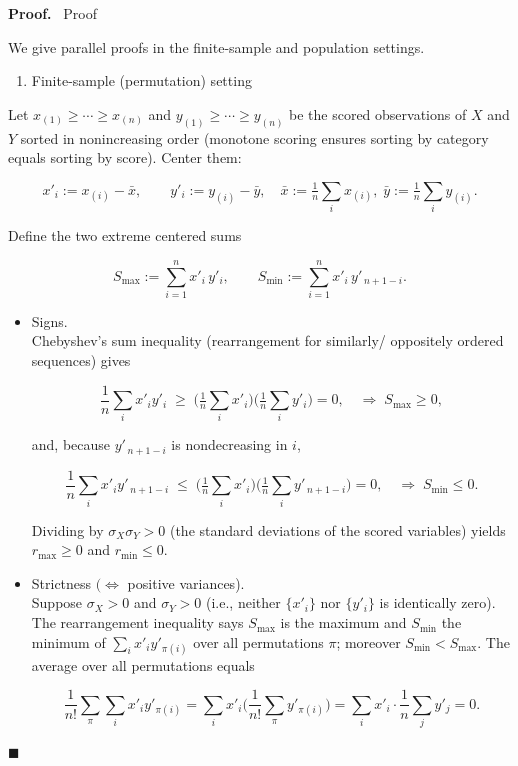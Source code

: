 \documentclass[
  12pt,
]{article}
\providecommand{\tightlist}{%
  \setlength{\itemsep}{0pt}\setlength{\parskip}{0pt}}
\theoremstyle{plain}
\theoremstyle{definition}
\renewenvironment{proof}
   {\par\noindent\textbf{Proof.}\ }
   {\hfill$\blacksquare$\par}
\theoremstyle{remark}
\begin{document}
\begin{proof}
Proof

We give parallel proofs in the finite-sample and population settings.

\begin{enumerate}
\def\labelenumi{\Alph{enumi})}
\tightlist
\item
  Finite-sample (permutation) setting
\end{enumerate}

Let \(x_{(1)}\ge\cdots\ge x_{(n)}\) and \(y_{(1)}\ge\cdots\ge y_{(n)}\)
be the scored observations of \(X\) and \(Y\) sorted in nonincreasing
order (monotone scoring ensures sorting by category equals sorting by
score). Center them:

\[x'_i := x_{(i)}-\bar x,\qquad y'_i := y_{(i)}-\bar y,\quad  
\bar x := \tfrac1n\sum_i x_{(i)},\;\bar y := \tfrac1n\sum_i y_{(i)}.\]

Define the two extreme centered sums

\[S_{\max} := \sum_{i=1}^n x'_i\,y'_i,\qquad  
S_{\min} := \sum_{i=1}^n x'_i\,y'_{\,n+1-i}.\]

\begin{itemize}
\item
  Signs.\\
  Chebyshev's sum inequality (rearrangement for similarly/ oppositely
  ordered sequences) gives

  \[\frac1n\sum_i x'_i y'_i \;\ge\; \Big(\tfrac1n\sum_i x'_i\Big)\Big(\tfrac1n\sum_i y'_i\Big)=0,  
    \quad\Rightarrow\; S_{\max}\ge 0,\]

  and, because \(y'_{\,n+1-i}\) is nondecreasing in \(i\),

  \[\frac1n\sum_i x'_i y'_{\,n+1-i} \;\le\; \Big(\tfrac1n\sum_i x'_i\Big)\Big(\tfrac1n\sum_i y'_{\,n+1-i}\Big)=0,  
    \quad\Rightarrow\; S_{\min}\le 0.\]

  Dividing by \(\sigma_X\sigma_Y>0\) (the standard deviations of the
  scored variables) yields \(r_{\max}\ge 0\) and \(r_{\min}\le 0\).
\item
  Strictness \((\Leftrightarrow\) positive variances).\\
  Suppose \(\sigma_X>0\) and \(\sigma_Y>0\) (i.e., neither \(\{x'_i\}\)
  nor \(\{y'_i\}\) is identically zero). The rearrangement inequality
  says \(S_{\max}\) is the maximum and \(S_{\min}\) the minimum of
  \(\sum_i x'_i y'_{\pi(i)}\) over all permutations \(\pi\); moreover
  \(S_{\min}<S_{\max}\). The average over all permutations equals

  \[\frac1{n!}\sum_{\pi}\sum_i x'_i y'_{\pi(i)}  
    = \sum_i x'_i \Big(\frac1{n!}\sum_{\pi} y'_{\pi(i)}\Big)  
    = \sum_i x'_i \cdot \frac1n\sum_j y'_j  
    = 0.\]


\end{itemize}
\end{proof}
\end{document}
